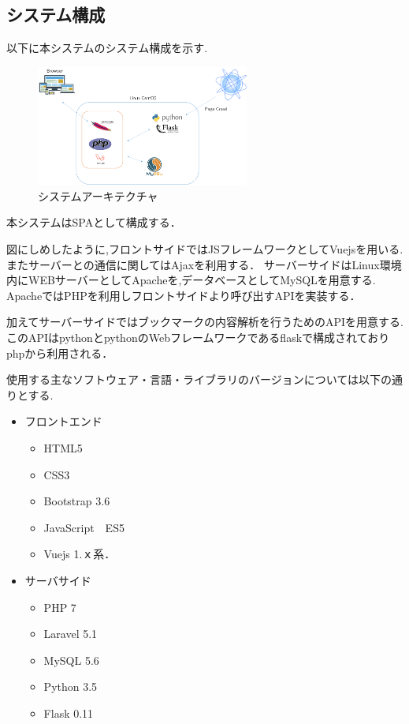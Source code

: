 \subsection{システム構成}
以下に本システムのシステム構成を示す.
\begin{figure}[htbp]
  \begin{center}
    \includegraphics[clip,width=7.0cm]{./architecture.png}
    \caption{システムアーキテクチャ}
    \label{fig:system}
  \end{center}
\end{figure}
本システムはSPAとして構成する．\par
図にしめしたように,フロントサイドではJSフレームワークとしてVuejsを用いる. またサーバーとの通信に関してはAjaxを利用する．
サーバーサイドはLinux環境内にWEBサーバーとしてApacheを,データベースとしてMySQLを用意する. ApacheではPHPを利用しフロントサイドより呼び出すAPIを実装する．\par
加えてサーバーサイドではブックマークの内容解析を行うためのAPIを用意する. このAPIはpythonとpythonのWebフレームワークであるflaskで構成されておりphpから利用される．\\
\par
使用する主なソフトウェア・言語・ライブラリのバージョンについては以下の通りとする.
\begin{itemize}
 \item フロントエンド
    \begin{itemize}
    \item HTML5
    \item CSS3
      \item Bootstrap 3.6
      \item JavaScript　ES5
      \item Vuejs 1.ｘ系．
     \end{itemize}
 \item サーバサイド
     \begin{itemize}
    \item PHP 7
    \item Laravel  5.1
      \item MySQL 5.6
      \item Python 3.5
      \item Flask 0.11
     \end{itemize}
\end{itemize}
